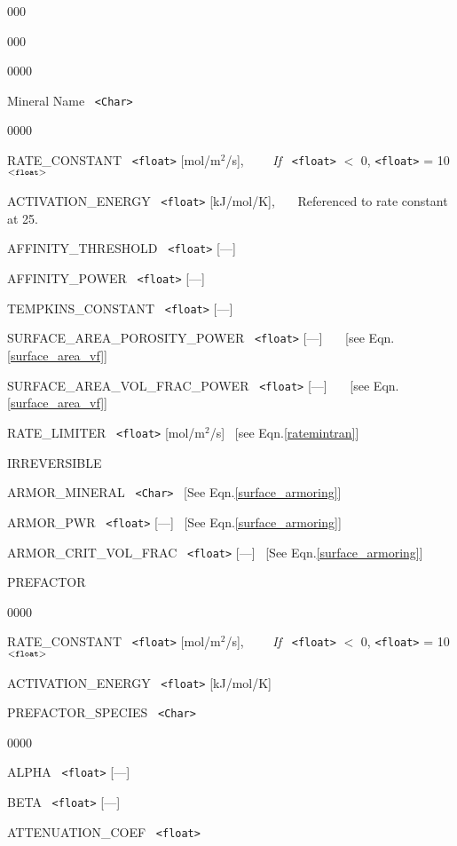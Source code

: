\begin{deflist}{000}
\begin{deflist}{000}
\begin{deflist}{0000}
\item [Mineral Name]  \ {\tt <Char>}
\begin{deflist}{0000}
\item [RATE\_CONSTANT] \ {\tt <float>} [mol/m$^2$/s], \ \ \ \ {\em If} \ {\tt <float>} $<$ 0, {\tt <float>} = 10$^{\tt <float>}$
\item [ACTIVATION\_ENERGY] \ {\tt <float>} [kJ/mol/K], \ \ \ Referenced to rate constant at 25\degc.
~\\
\item [AFFINITY\_THRESHOLD] \ {\tt <float>} [---]
\item [AFFINITY\_POWER] \ {\tt <float>} [---]
~\\
\item [TEMPKINS\_CONSTANT] \ {\tt <float>} [---]
~\\
\item [SURFACE\_AREA\_POROSITY\_POWER] \ {\tt <float>} [---] \ \ \ [see Eqn.\eqref{surface_area_vf}]
\item [SURFACE\_AREA\_VOL\_FRAC\_POWER] \ {\tt <float>} [---] \ \ \ [see Eqn.\eqref{surface_area_vf}]
~\\
\item [RATE\_LIMITER] \ {\tt <float>} [mol/m$^2$/s] \ [see Eqn.\eqref{ratemintran}]
~\\
\item [IRREVERSIBLE] \ 
~\\
\item[ARMOR\_MINERAL] \ {\tt <Char>} \ [See Eqn.\eqref{surface_armoring}]
\item[ARMOR\_PWR] \ {\tt <float>} [---] \ [See Eqn.\eqref{surface_armoring}]
\item[ARMOR\_CRIT\_VOL\_FRAC] \ {\tt <float>} [---] \ [See Eqn.\eqref{surface_armoring}]
~\\
\item [PREFACTOR] ~
\begin{deflist}{0000}
\item [RATE\_CONSTANT] \ {\tt <float>} [mol/m$^2$/s], \ \ \ \ {\em If} \ {\tt <float>} $<$ 0, {\tt <float>} = 10$^{\tt <float>}$
\item [ACTIVATION\_ENERGY] \ {\tt <float>} [kJ/mol/K] 
\item [PREFACTOR\_SPECIES] \ {\tt <Char>}
\begin{deflist}{0000}
\item [ALPHA] \ {\tt <float>} [---]
\item [BETA] \ {\tt <float>} [---]
\item [ATTENUATION\_COEF] \ {\tt <float>}
\end{deflist}
\item [\keyend]
\end{deflist}
\item [\keyend]
\end{deflist}


\end{deflist}
\end{deflist}
\end{deflist}
